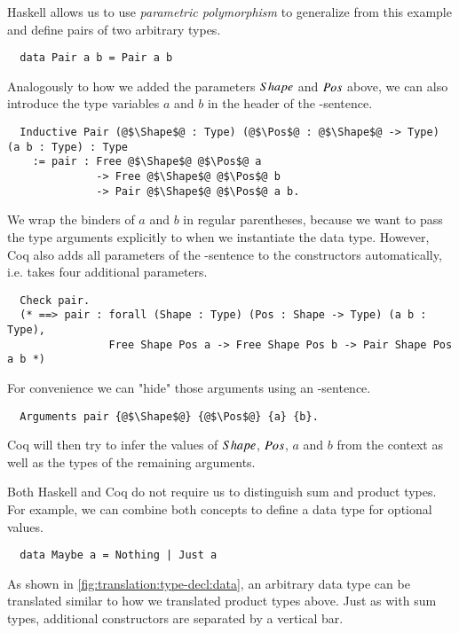 Haskell allows us to use \textit{parametric polymorphism} to generalize from this example and define pairs of two arbitrary types.
\begin{verbatim}
  data Pair a b = Pair a b
\end{verbatim}
Analogously to how we added the parameters $Shape$ and $Pos$ above, we can also introduce the type variables $a$ and $b$ in the header of the -sentence.
\begin{verbatim}
  Inductive Pair (@$\Shape$@ : Type) (@$\Pos$@ : @$\Shape$@ -> Type) (a b : Type) : Type
    := pair : Free @$\Shape$@ @$\Pos$@ a
              -> Free @$\Shape$@ @$\Pos$@ b
              -> Pair @$\Shape$@ @$\Pos$@ a b.
\end{verbatim}
We wrap the binders of $a$ and $b$ in regular parentheses, because we want to pass the type arguments explicitly to  when we instantiate the data type.
However, Coq also adds all parameters of the -sentence to the constructors automatically, i.e.  takes four additional parameters.
\begin{verbatim}
  Check pair.
  (* ==> pair : forall (Shape : Type) (Pos : Shape -> Type) (a b : Type),
                Free Shape Pos a -> Free Shape Pos b -> Pair Shape Pos a b *)
\end{verbatim}
For convenience we can "hide" those arguments using an -sentence.
\begin{verbatim}
  Arguments pair {@$\Shape$@} {@$\Pos$@} {a} {b}.
\end{verbatim}
Coq will then try to infer the values of $Shape$, $Pos$, $a$ and $b$ from the context as well as the types of the remaining arguments.

Both Haskell and Coq do not require us to distinguish sum and product types.
For example, we can combine both concepts to define a data type for optional values.
\begin{verbatim}
  data Maybe a = Nothing | Just a
\end{verbatim}
As shown in \autoref{fig:translation:type-decl:data}, an arbitrary data type can be translated similar to how we translated product types above.
Just as with sum types, additional constructors are separated by a vertical bar.

